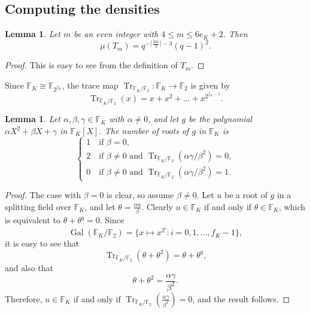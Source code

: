 \documentclass[11pt]{amsart}
\theoremstyle{theorem}
\newtheorem{lemma}[theorem]{Lemma}
\theoremstyle{example}
\theoremstyle{definition}
\numberwithin{theorem}{section}
\numberwithin{theorem}{section}
\DeclareMathOperator{\Tr}{Tr}
\DeclareMathOperator{\Gal}{Gal}
\newcommand{\F}{\mathbb{F}}
\begin{document}
\subsection{Computing the densities}
\begin{lemma}
    \label{lem-mu-Tm}
    Let $m$ be an even integer with $4 \leq m \leq 6e_K + 2$. Then 
    $$
    \mu(T_m) = q^{-\lceil \frac{2m}{3}\rceil - 3}(q-1)^2. 
    $$
\end{lemma}
\begin{proof}
    This is easy to see from the definition of $T_m$. 
\end{proof}
Since $\F_K \cong \F_{2^{f_K}}$, the trace map $\Tr_{\F_K/\F_2}: \F_K \to \F_2$ is given by 
$$
\Tr_{\F_K/\F_2}(x) = x + x^2 + \ldots + x^{2^{f_K-1}}. 
$$
\begin{lemma}
    \label{lem-num-roots-quadratic}
    Let $\alpha,\beta,\gamma\in \F_K$ with $\alpha \neq 0$, and let $g$ be the polynomial $\alpha X^2 + \beta X + \gamma$ in $\F_K[X]$. The number of roots of $g$ in $\F_K$ is 
    $$
    \begin{cases}
        1 \quad \text{if $\beta = 0$},
        \\
        2 \quad \text{if $\beta \neq 0$ and $\Tr_{\F_K/\F_2}(\alpha\gamma/\beta^2) = 0$},
        \\
        0 \quad \text{if $\beta\neq 0$ and $\Tr_{\F_K/\F_2}(\alpha\gamma/\beta^2) = 1$}.
    \end{cases}
    $$
\end{lemma}
\begin{proof}
    The case with $\beta = 0$ is clear, so assume $\beta \neq 0$. Let $u$ be a root of $g$ in a splitting field over $\F_K$, and let $\theta = \frac{\alpha u}{\beta}$. Clearly $u \in \F_K$ if and only if $\theta \in \F_K$, which is equivalent to $\theta + \theta^{q} = 0$. Since
    $$
    \Gal(\F_K/\F_2) = \{x\mapsto x^{2^i} : i = 0,1,\ldots, f_K - 1\},
    $$
    it is easy to see that 
    $$
    \Tr_{\F_K/\F_2}(\theta + \theta^2) = \theta + \theta^q,
    $$
    and also that 
    $$
    \theta + \theta^2 = \frac{\alpha\gamma}{\beta^2}.
    $$
    Therefore, $u \in \F_K$ if and only if $\Tr_{\F_K/\F_2}(\frac{\alpha\gamma}{\beta^2}) = 0$, and the result follows. 
\end{proof}
\end{document}
